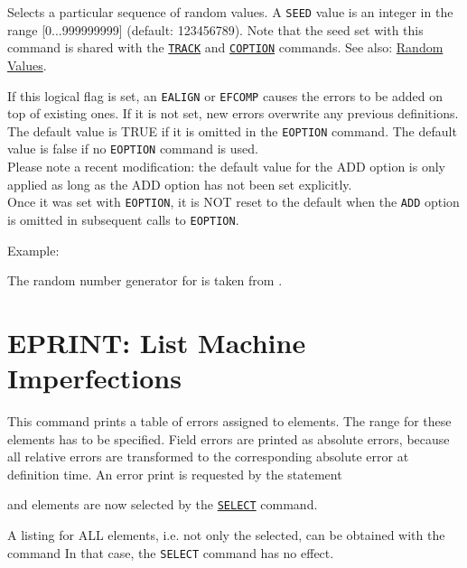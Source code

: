 \begin{madlist}
   Selects a particular sequence of random values. 
  A \texttt{SEED} value is an integer in the range [0...999999999] (default:
  123456789). Note that the seed set with this command is shared with the \hyperref[sec:track]{\texttt{TRACK}} and \hyperref[sec:coption]{\texttt{COPTION}} commands. See
  also: \hyperref[subsubsec:random]{Random Values}. 

   If this logical flag is set, an \texttt{EALIGN} or \texttt{EFCOMP} 
  causes the errors to be added on top of existing ones. If it is not set,
  new errors overwrite any previous definitions. The default value is
  TRUE if it is omitted in the \texttt{EOPTION} command. The default value is
  false if no \texttt{EOPTION} command is used.  
  \\Please note a recent modification: the default value for the ADD
  option is only applied as long as the ADD option has not been set
  explicitly. 
  \\Once it was set with \texttt{EOPTION}, it is NOT reset to the default when
  the \texttt{ADD} option is omitted in subsequent calls to \texttt{EOPTION}.  
\end{madlist}

Example: 

The random number generator for \madx is taken from
\cite{knuth1981}. 


%

\section{EPRINT: List Machine Imperfections}  
\label{sec:eprint}
This command prints a table of errors assigned to elements. The range
for these elements has to be specified. Field errors are printed as
absolute errors, because all relative errors are transformed to the
corresponding absolute error at definition time. An error print is
requested by the statement  

and elements are now selected by the
\hyperref[sec:select]{\texttt{SELECT}} command.  

A listing for ALL elements, i.e. not only the selected, can be obtained
with the command  
In that case, the \texttt{SELECT} command has no effect.

